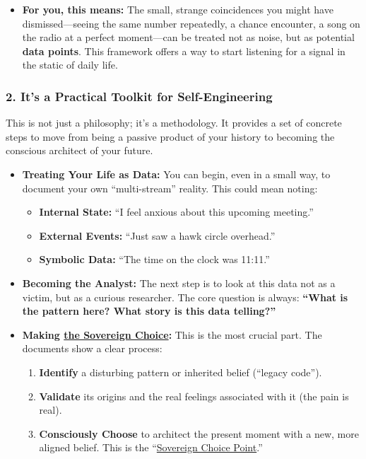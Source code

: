 \documentclass{article}
\begin{document}
\begin{itemize}
\item
  \textbf{For you, this means:} The small, strange coincidences you might have dismissed---seeing the same number repeatedly, a chance encounter, a song on the radio at a perfect moment---can be treated not as noise, but as potential \textbf{data points}. This framework offers a way to start listening for a signal in the static of daily life.
\end{itemize}

\subsubsection*{2. It's a Practical Toolkit for Self-Engineering}\label{its-a-practical-toolkit-for-self-engineering}

This is not just a philosophy; it's a methodology. It provides a set of concrete steps to move from being a passive product of your history to becoming the conscious architect of your future.

\begin{itemize}
\item
  \textbf{Treating Your Life as Data:} You can begin, even in a small way, to document your own ``multi-stream'' reality. This could mean noting:

  \begin{itemize}
  \item
    \textbf{Internal State:} ``I feel anxious about this upcoming meeting.''
  \item
    \textbf{External Events:} ``Just saw a hawk circle overhead.''
  \item
    \textbf{Symbolic Data:} ``The time on the clock was 11:11.''
  \end{itemize}
\item
  \textbf{Becoming the Analyst:} The next step is to look at this data not as a victim, but as a curious researcher. The core question is always: \textbf{``What is the pattern here? What story is this data telling?''}
\item
  \textbf{Making \hyperlink{gloss:sovereign_choice}{the Sovereign Choice}:} This is the most crucial part. The documents show a clear process:

  \begin{enumerate}
  \item
    \textbf{Identify} a disturbing pattern or inherited belief (``legacy code'').
  \item
    \textbf{Validate} its origins and the real feelings associated with it (the pain is real).
  \item
    \textbf{Consciously Choose} to architect the present moment with a new, more aligned belief. This is the ``\hyperlink{gloss:sovereign_choice_point}{Sovereign Choice Point}.''
  \end{enumerate}
\end{itemize}
\end{document}
